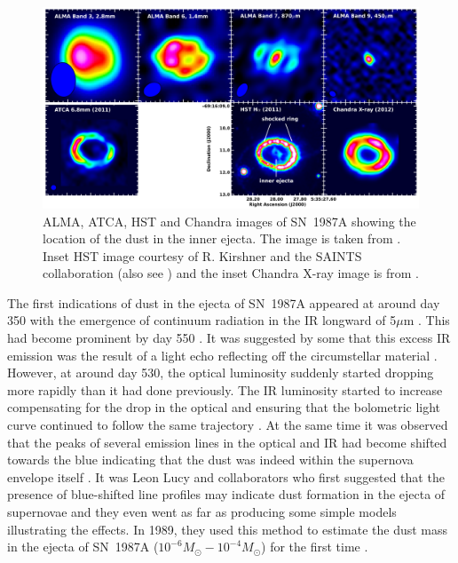 \begin{figure}
\centering
\includegraphics[clip=true,scale=0.31,trim= 0 0 0 0]{chapters/chapter5/images/ALMA_imgs.png}
\caption{ALMA, ATCA, HST and Chandra images of SN~1987A showing the location of the dust in the inner ejecta.  The image is taken from \citep{Indebetouw2014}.  Inset HST image courtesy of R. Kirshner and the SAINTS collaboration (also see \citet{Larsson2013}) and the inset Chandra X-ray image is from \citet{Helder2013}.}
\label{ALMA}
\end{figure}

The first indications of dust in the ejecta of SN~1987A appeared at around day 350 with the emergence of continuum radiation in the IR longward of 5$\mu$m \citep{Meikle1993}.  This had become prominent by day 550 \citep{Roche1993,Wooden1993}.  It was suggested by some that this excess IR emission was the result of  a light echo reflecting off the circumstellar material \citep{Roche1989}.  However, at around day 530, the optical luminosity suddenly started dropping more rapidly than it had done previously.  The IR luminosity started to increase  compensating for the drop in the optical and ensuring that the bolometric light curve continued to follow the same trajectory \citep{Suntzeff1991,Whitelock1991}.  At the same time it was observed that the peaks of several emission lines in the optical and IR had become shifted towards the blue indicating that the dust was indeed within the supernova envelope itself \citep{Danziger1991a,Danziger1991,Meikle1991,Meikle1993,Suntzeff1991,Hanuschik1993}.  It was Leon Lucy and collaborators who first suggested that the presence of blue-shifted line profiles may indicate dust formation in the ejecta of supernovae and they even went as far as producing some simple models illustrating the effects.  In 1989, they used this method to estimate the dust mass in the ejecta of SN~1987A ($10^{-6}M_{\odot} - 10^{-4}M_{\odot}$) for the first time \citep{Lucy1989,Lucy1991}.  

